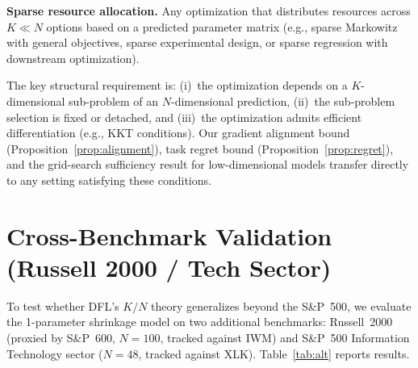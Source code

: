 \documentclass[letterpaper]{article}
\begin{document}
\textbf{Sparse resource allocation.} Any optimization that distributes resources across $K \ll N$ options based on a predicted parameter matrix (e.g., sparse Markowitz with general objectives, sparse experimental design, or sparse regression with downstream optimization).

The key structural requirement is: (i)~the optimization depends on a $K$-dimensional sub-problem of an $N$-dimensional prediction, (ii)~the sub-problem selection is fixed or detached, and (iii)~the optimization admits efficient differentiation (e.g., KKT conditions). Our gradient alignment bound (Proposition~\ref{prop:alignment}), task regret bound (Proposition~\ref{prop:regret}), and the grid-search sufficiency result for low-dimensional models transfer directly to any setting satisfying these conditions.

\section{Cross-Benchmark Validation (Russell 2000 / Tech Sector)}
\label{app:crossbench}

To test whether DFL's $K/N$ theory generalizes beyond the S\&P~500, we evaluate the 1-parameter shrinkage model on two additional benchmarks: Russell~2000 (proxied by S\&P~600, $N{=}100$, tracked against IWM) and S\&P~500 Information Technology sector ($N{=}48$, tracked against XLK). Table~\ref{tab:alt} reports results.

\begin{table}[h]
\centering
\caption{Cross-benchmark validation (shrinkage model). DFL gain is negligible, confirming 1-parameter models are exhaustively searchable.}
\label{tab:alt}
\footnotesize
{}
\end{table}
\end{document}
